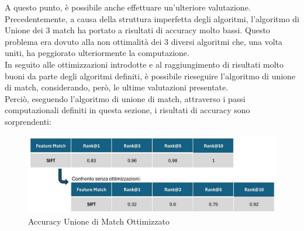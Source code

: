 \documentclass[12pt,a4paper,openright,twoside]{book}
\begin{document}
A questo punto, è possibile anche effettuare un'ulteriore valutazione. Precedentemente, a causa della struttura imperfetta degli algoritmi, l'algoritmo di Unione dei 3 match ha portato a risultati di accuracy molto bassi. Questo problema era dovuto alla non ottimalità dei 3 diversi algoritmi che, una volta uniti, ha peggiorato ulteriormente la computazione.\\
In seguito alle ottimizzazioni introdotte e al raggiungimento di risultati molto buoni da parte degli algoritmi definiti, è possibile rieseguire l'algoritmo di unione di match, considerando, però, le ultime valutazioni presentate.\\
Perciò, eseguendo l'algoritmo di unione di match, attraverso i passi computazionali definiti in questa sezione, i risultati di accuracy sono sorprendenti:
\begin{figure}[H]
	\centering
	\includegraphics[width=16cm]{figures/3match_1.pdf}
    	\caption{Accuracy Unione di Match Ottimizzato}
	\label{fig:unioneopt}
\end{figure}

\end{document}
